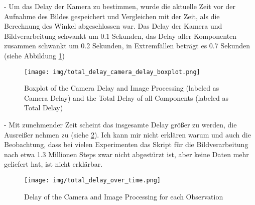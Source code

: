- Um das Delay der Kamera zu bestimmen, wurde die aktuelle Zeit vor der Aufnahme des Bildes gespeichert und Vergleichen mit der Zeit, als die Berechnung des Winkel abgeschlossen war. Das Delay der Kamera und Bildverarbeitung schwankt um 0.1 Sekunden, das Delay aller Komponenten zusammen schwankt um 0.2 Sekunden, in Extremfällen beträgt es 0.7 Sekunden (siehe Abbildung \ref{fig:camera_delay_boxplot})
\begin{figure}
    \centering
    \texttt{[image: img/total\_delay\_camera\_delay\_boxplot.png]}
    \caption{Boxplot of the Camera Delay and Image Processing (labeled as Camera Delay) and the Total Delay of all Components (labeled as Total Delay)}
    \label{fig:camera_delay_boxplot}
\end{figure}
- Mit zunehmender Zeit scheint das insgesamte Delay größer zu werden, die Ausreißer nehmen zu (siehe \ref{fig:total_delay_over_time}). Ich kann mir nicht erklären warum und auch die Beobachtung, dass bei vielen Experimenten das Skript für die Bildverarbeitung nach etwa 1.3 Millionen Steps zwar nicht abgestürzt ist, aber keine Daten mehr geliefert hat, ist nicht erklärbar.
\begin{figure}
    \centering
    \texttt{[image: img/total\_delay\_over\_time.png]}
    \caption{Delay of the Camera and Image Processing for each Observation}
    \label{fig:total_delay_over_time}
\end{figure}